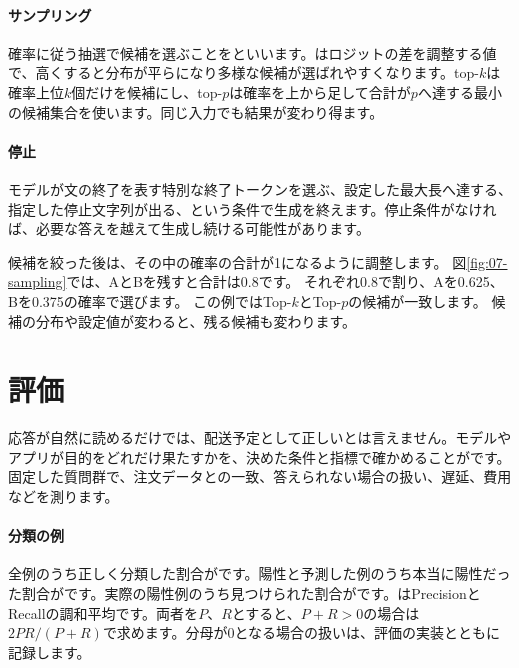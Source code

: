\paragraph{サンプリング}
        確率に従う抽選で候補を選ぶことをといいます。はロジットの差を調整する値で、高くすると分布が平らになり多様な候補が選ばれやすくなります。top-$k$は確率上位$k$個だけを候補にし、top-$p$は確率を上から足して合計が$p$へ達する最小の候補集合を使います。同じ入力でも結果が変わり得ます。

\par
\endgroup
\medskip
\begingroup
\paragraph{停止}
        モデルが文の終了を表す特別な終了トークンを選ぶ、設定した最大長へ達する、指定した停止文字列が出る、という条件で生成を終えます。停止条件がなければ、必要な答えを越えて生成し続ける可能性があります。

\par
\endgroup
\par
\endgroup


候補を絞った後は、その中の確率の合計が1になるように調整します。
図\ref{fig:07-sampling}では、AとBを残すと合計は0.8です。
それぞれ0.8で割り、Aを0.625、Bを0.375の確率で選びます。
この例ではTop-$k$とTop-$p$の候補が一致します。
候補の分布や設定値が変わると、残る候補も変わります。

\section{評価}
\label{sec:06-machine-learning-31}

応答が自然に読めるだけでは、配送予定として正しいとは言えません。モデルやアプリが目的をどれだけ果たすかを、決めた条件と指標で確かめることがです。固定した質問群で、注文データとの一致、答えられない場合の扱い、遅延、費用などを測ります。

\begingroup
\begingroup
\paragraph{分類の例}
        全例のうち正しく分類した割合がです。陽性と予測した例のうち本当に陽性だった割合がです。実際の陽性例のうち見つけられた割合がです。はPrecisionとRecallの調和平均です。両者を$P$、$R$とすると、$P+R>0$の場合は$2PR/(P+R)$で求めます。分母が0となる場合の扱いは、評価の実装とともに記録します。

